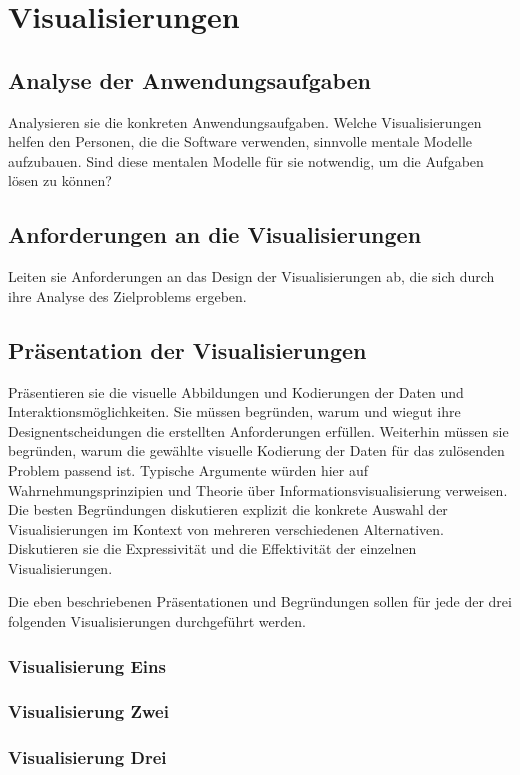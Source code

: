 \documentclass[usegeometry=true]{scrartcl}
\begin{document}
\section{Visualisierungen}
\subsection{Analyse der Anwendungsaufgaben}
Analysieren sie die konkreten Anwendungsaufgaben. Welche Visualisierungen helfen den Personen, die die Software verwenden, sinnvolle mentale Modelle aufzubauen. Sind diese mentalen Modelle für sie notwendig, um die Aufgaben lösen zu können?
\subsection{Anforderungen an die Visualisierungen}
Leiten sie Anforderungen an das Design der Visualisierungen ab, die sich durch ihre Analyse des Zielproblems ergeben.
\subsection{Präsentation der Visualisierungen}
Präsentieren sie die visuelle Abbildungen und Kodierungen der Daten und Interaktionsmöglichkeiten. 
Sie müssen  begründen, warum und wiegut ihre Designentscheidungen die erstellten Anforderungen erfüllen. 
Weiterhin müssen sie begründen, warum die gewählte visuelle Kodierung der Daten für das zulösenden Problem passend ist. 
Typische Argumente würden hier auf Wahrnehmungsprinzipien und Theorie über Informationsvisualisierung verweisen. 
Die besten Begründungen diskutieren explizit die konkrete Auswahl der Visualisierungen im Kontext von mehreren verschiedenen Alternativen. Diskutieren sie die Expressivität und die Effektivität der einzelnen Visualisierungen. 

Die eben beschriebenen Präsentationen und Begründungen sollen für jede der drei folgenden Visualisierungen durchgeführt werden. 
\subsubsection{Visualisierung Eins}
\subsubsection{Visualisierung Zwei}
\subsubsection{Visualisierung Drei}
\end{document}
